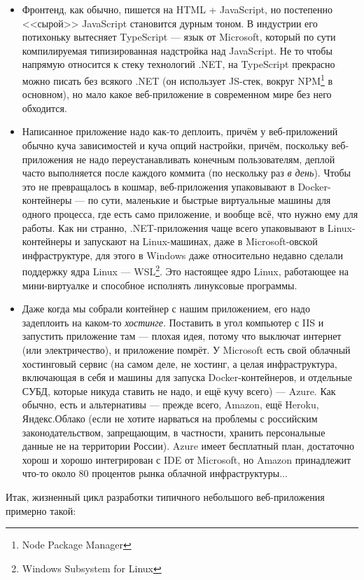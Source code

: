 \documentclass{../../text-style}
\begin{document}
\begin{itemize}
    \item Фронтенд, как обычно, пишется на HTML + JavaScript, но постепенно <<сырой>> JavaScript становится дурным тоном. В индустрии его потихоньку вытесняет TypeScript --- язык от Microsoft, который по сути компилируемая типизированная надстройка над JavaScript. Не то чтобы напрямую относится к стеку технологий .NET, на TypeScript прекрасно можно писать без всякого .NET (он использует JS-стек, вокруг NPM\footnote{Node Package Manager} в основном), но мало какое веб-приложение в современном мире без него обходится.
    \item Написанное приложение надо как-то деплоить, причём у веб-приложений обычно куча зависимостей и куча опций настройки, причём, поскольку веб-приложения не надо переустанавливать конечным пользователям, деплой часто выполняется после каждого коммита (по нескольку раз \emph{в день}). Чтобы это не превращалось в кошмар, веб-приложения упаковывают в Docker-контейнеры --- по сути, маленькие и быстрые виртуальные машины для одного процесса, где есть само приложение, и вообще всё, что нужно ему для работы. Как ни странно, .NET-приложения чаще всего упаковывают в Linux-контейнеры и запускают на Linux-машинах, даже в Microsoft-овской инфраструктуре, для этого в Windows даже относительно недавно сделали поддержку ядра Linux --- WSL\footnote{Windows Subsystem for Linux}. Это настоящее ядро Linux, работающее на мини-виртуалке и способное исполнять линуксовые программы.
    \item Даже когда мы собрали контейнер с нашим приложением, его надо задеплоить на каком-то \emph{хостинге}. Поставить в угол компьютер с IIS и запустить приложение там --- плохая идея, потому что выключат интернет (или электричество), и приложение помрёт. У Microsoft есть свой облачный хостинговый сервис (на самом деле, не хостинг, а целая инфраструктура, включающая в себя и машины для запуска Docker-контейнеров, и отдельные СУБД, которые никуда ставить не надо, и ещё кучу всего) --- Azure. Как обычно, есть и альтернативы --- прежде всего, Amazon, ещё Heroku, Яндекс.Облако (если не хотите нарваться на проблемы с российским законодательством, запрещающим, в частности, хранить персональные данные не на территории России). Azure имеет бесплатный план, достаточно хорош и хорошо интегрирован с IDE от Microsoft, но Amazon принадлежит что-то около 80 процентов рынка облачной инфраструктуры...
\end{itemize}

Итак, жизненный цикл разработки типичного небольшого веб-приложения примерно такой:
\end{document}
